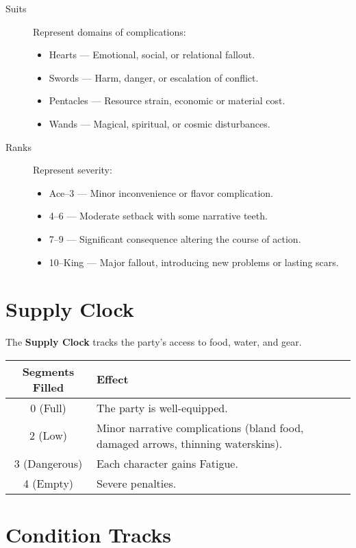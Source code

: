 \begin{description}
  \item[Suits] Represent domains of complications:
    \begin{itemize}
      \item Hearts — Emotional, social, or relational fallout.
      \item Swords — Harm, danger, or escalation of conflict.
      \item Pentacles — Resource strain, economic or material cost.
      \item Wands — Magical, spiritual, or cosmic disturbances.
    \end{itemize}
  \item[Ranks] Represent severity:
    \begin{itemize}
      \item Ace–3 — Minor inconvenience or flavor complication.
      \item 4–6 — Moderate setback with some narrative teeth.
      \item 7–9 — Significant consequence altering the course of action.
      \item 10–King — Major fallout, introducing new problems or lasting scars.
    \end{itemize}
\end{description}

\section{Supply Clock}

The \textbf{Supply Clock} tracks the party's access to food, water, and gear.

\begin{center}
\begin{tabular}{cl}
\toprule
\textbf{Segments Filled} & \textbf{Effect} \\
\midrule
0 (Full) & The party is well-equipped. \\
2 (Low) & Minor narrative complications (bland food, damaged arrows, thinning waterskins). \\
3 (Dangerous) & Each character gains Fatigue. \\
4 (Empty) & Severe penalties. \\
\bottomrule
\end{tabular}
\end{center}

\section{Condition Tracks}

